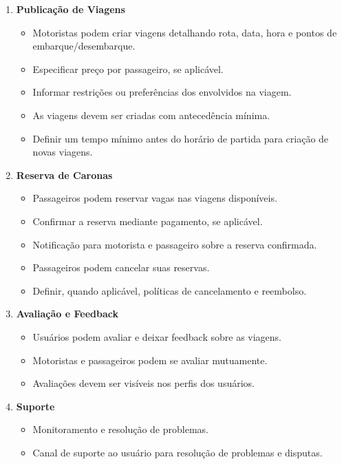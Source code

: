 \begin{enumerate}
	\item \textbf{Publicação de Viagens}
	
	\begin{itemize}
		\item Motoristas podem criar viagens detalhando rota, data, hora e pontos de embarque/desembarque.
		\item Especificar preço por passageiro, se aplicável.
		\item Informar restrições ou preferências dos envolvidos na viagem.
		\item As viagens devem ser criadas com antecedência mínima.
		\item Definir um tempo mínimo antes do horário de partida para criação de novas viagens.
	\end{itemize}
	
	\item \textbf{Reserva de Caronas}
	
	\begin{itemize}
		\item Passageiros podem reservar vagas nas viagens disponíveis.
		\item Confirmar a reserva mediante pagamento, se aplicável.
		\item Notificação para motorista e passageiro sobre a reserva confirmada.
		\item Passageiros podem cancelar suas reservas.
		\item Definir, quando aplicável, políticas de cancelamento e reembolso.
	\end{itemize}
	
	\item \textbf{Avaliação e Feedback}
	
	\begin{itemize}
		\item Usuários podem avaliar e deixar feedback sobre as viagens.
		\item Motoristas e passageiros podem se avaliar mutuamente.
		\item Avaliações devem ser visíveis nos perfis dos usuários.
	\end{itemize}
	
	\item \textbf{Suporte}
	
	\begin{itemize}
		\item Monitoramento e resolução de problemas.
		\item Canal de suporte ao usuário para resolução de problemas e disputas.
	\end{itemize}
	
\end{enumerate}

